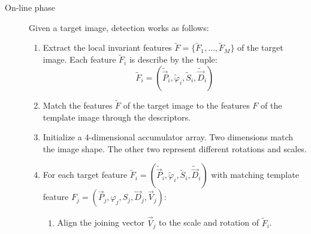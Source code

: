 \begin{description}
    \item[On-line phase] 
        Given a target image, detection works as follows:
        \begin{enumerate}
            \item Extract the local invariant features $\tilde{F} = \{ \tilde{F}_1, \dots, \tilde{F}_M \}$ of the target image.
                Each feature $\tilde{F}_i$ is describe by the tuple:
                \[ \tilde{F}_i = (\tilde{\vec{P}}_i, \tilde{\varphi}_i, \tilde{S}_i, \tilde{\vec{D}}_i) \]
            \item Match the features $\tilde{F}$ of the target image to the features $F$ of the template image through the descriptors.
            \item Initialize a 4-dimensional accumulator array. Two dimensions match the image shape. 
                The other two represent different rotations and scales.
            \item For each target feature $\tilde{F}_i = (\tilde{\vec{P}}_i, \tilde{\varphi}_i, \tilde{S}_i, \tilde{\vec{D}}_i)$ 
                with matching template feature $F_j = (\vec{P}_j, \varphi_j, S_j, \vec{D}_j, \vec{V}_j)$:
                \begin{enumerate}
                    \item Align the joining vector $\vec{V}_j$ to the scale and rotation of $\tilde{F}_i$.
                        

\end{enumerate}
\end{enumerate}
\end{description}
